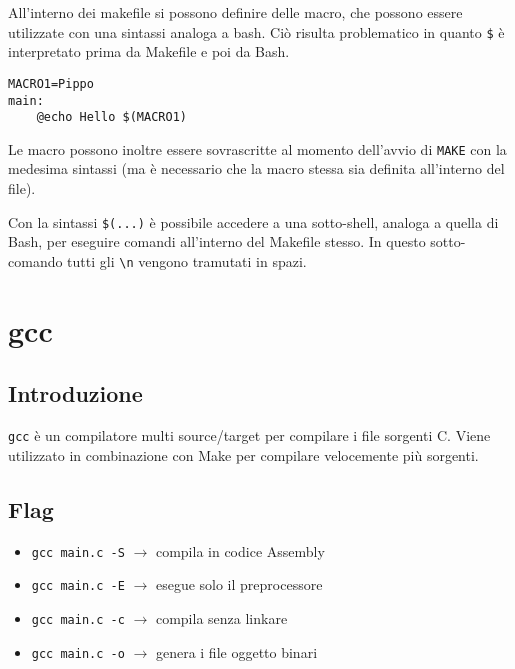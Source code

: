 \documentclass[a4paper]{article}
\begin{document}
All'interno dei makefile si possono definire delle macro, che possono essere utilizzate con una sintassi analoga a bash. Ciò risulta problematico in quanto \verb|$| è interpretato prima da Makefile e poi da Bash.

\begin{verbatim}
MACRO1=Pippo
main:
    @echo Hello $(MACRO1)
\end{verbatim}

Le macro possono inoltre essere sovrascritte al momento dell'avvio di \verb|MAKE| con la medesima sintassi (ma è necessario che la macro stessa sia definita all'interno del file). 

Con la sintassi \verb|$(...)| è possibile accedere a una sotto-shell, analoga a quella di Bash, per eseguire comandi all'interno del Makefile stesso. In questo sotto-comando tutti gli \verb|\n| vengono tramutati in spazi.

\section{gcc}

\subsection{Introduzione}

\verb|gcc| è un compilatore multi source/target per compilare i file sorgenti C. Viene utilizzato in combinazione con Make per compilare velocemente più sorgenti.

\subsection{Flag}
\begin{itemize}
\item\verb|gcc main.c -S| $\rightarrow$ compila in codice Assembly
\item\verb|gcc main.c -E| $\rightarrow$ esegue solo il preprocessore
\item\verb|gcc main.c -c| $\rightarrow$ compila senza linkare
\item\verb|gcc main.c -o| $\rightarrow$ genera i file oggetto binari
\end{itemize}
\end{document}
